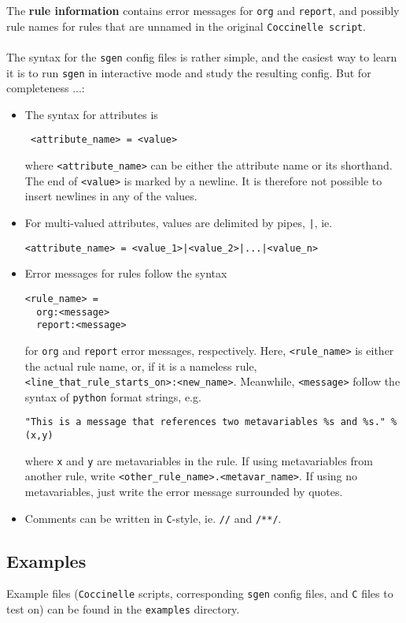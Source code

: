 The \textbf{rule information} contains error messages for \texttt{org} and \texttt{report}, and possibly rule names for rules that are unnamed in the original \texttt{Coccinelle script}.\\\\
\clearpage
\noindent The syntax for the \texttt{sgen} config files is rather simple, and the easiest way to learn it is to run \texttt{sgen} in interactive mode and study the resulting config. But for completeness ...:
\begin{itemize}
\item The syntax for attributes is
\begin{verbatim}
 <attribute_name> = <value>
\end{verbatim}
where \texttt{<attribute\_name>} can be either the attribute name or its shorthand. The end of \texttt{<value>} is marked by a newline. It is therefore not possible to insert newlines in any of the values.
\item For multi-valued attributes, values are delimited by pipes, \texttt{|}, ie.
\begin{verbatim}
<attribute_name> = <value_1>|<value_2>|...|<value_n>
\end{verbatim}
\item Error messages for rules follow the syntax
\begin{verbatim}
<rule_name> =
  org:<message>
  report:<message>
\end{verbatim}
for \texttt{org} and \texttt{report} error messages, respectively. Here, \texttt{<rule\_name>} is either the actual rule name, or, if it is a nameless rule, \texttt{<line\_that\_rule\_starts\_on>:<new\_name>}.\newline
Meanwhile, \texttt{<message>} follow the syntax of \texttt{python} format strings, e.g.
\begin{verbatim}
"This is a message that references two metavariables %s and %s." % (x,y)
\end{verbatim}
where \texttt{x} and \texttt{y} are metavariables in the rule. If using metavariables from another rule, write \texttt{<other\_rule\_name>.<metavar\_name>}. If using no metavariables, just write the error message surrounded by quotes.
\item Comments can be written in \texttt{C}-style, ie. \texttt{//} and \texttt{/**/}.
\end{itemize}
\bigskip

\subsection{Examples}
Example files (\texttt{Coccinelle} scripts, corresponding \texttt{sgen} config files, and \texttt{C} files to test on) can be found in the \texttt{examples} directory.

